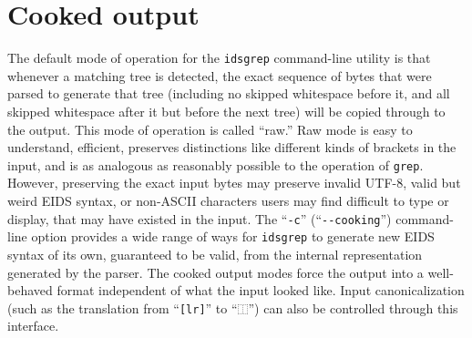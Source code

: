 \documentclass[twocolumn]{report}
\begin{document}

\section{Cooked output}

The default mode of operation for the \texttt{idsgrep} command-line utility
is that whenever a matching tree is detected, the exact sequence of bytes
that were parsed to generate that tree (including no skipped whitespace
before it, and all skipped whitespace after it but before the next tree)
will be copied through to the output.  This mode of operation is called
``raw.'' Raw mode is easy to understand, efficient, preserves distinctions
like different kinds of brackets in the input, and is as analogous as
reasonably possible to the operation of \texttt{grep}.  However, preserving
the exact input bytes may preserve invalid UTF-8, valid but weird EIDS
syntax, or non-ASCII characters users may find difficult to type or
display, that may have existed in the input.  The ``\texttt{-c}''
(``\texttt{-{}-cooking}'') command-line option provides a wide range of
ways for \texttt{idsgrep} to generate new EIDS syntax of its own, guaranteed
to be valid, from the internal representation generated by the parser.  The
cooked output modes force the output into a well-behaved format
independent of what the input looked like.
Input canonicalization (such as the translation from ``\texttt{[lr]}'' to
``\texttt{⿰}'') can also be controlled through this interface.
\end{document}
